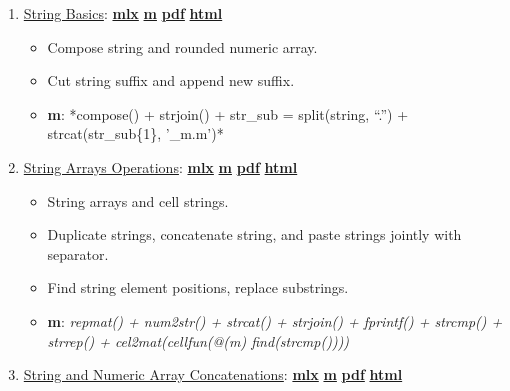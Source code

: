 \documentclass[
]{book}
\providecommand{\tightlist}{%
  \setlength{\itemsep}{0pt}\setlength{\parskip}{0pt}}
\begin{document}
\begin{enumerate}
\def\labelenumi{\arabic{enumi}.}
\tightlist
\item
  \href{https://fanwangecon.github.io/M4Econ/amto/string/htmlpdfm/fs_string.html}{String Basics}: \href{https://github.com/FanWangEcon/M4Econ/blob/master/amto/string/fs_string.mlx}{\textbf{mlx}} \textbar{} \href{https://github.com/FanWangEcon/M4Econ/blob/master/amto/string/htmlpdfm/fs_string.m}{\textbf{m}} \textbar{} \href{https://github.com/FanWangEcon/M4Econ/blob/master/amto/string/htmlpdfm/fs_string.pdf}{\textbf{pdf}} \textbar{} \href{https://fanwangecon.github.io/M4Econ/amto/string/htmlpdfm/fs_string.html}{\textbf{html}}

  \begin{itemize}
  \tightlist
  \item
    Compose string and rounded numeric array.
  \item
    Cut string suffix and append new suffix.
  \item
    \textbf{m}: *compose() + strjoin() + str\_sub = split(string, ``.'') + strcat(str\_sub\{1\}, '\_m.m')*
  \end{itemize}
\item
  \href{https://fanwangecon.github.io/M4Econ/amto/string/htmlpdfm/fs_string_array.html}{String Arrays Operations}: \href{https://github.com/FanWangEcon/M4Econ/blob/master/amto/string/fs_string_array.mlx}{\textbf{mlx}} \textbar{} \href{https://github.com/FanWangEcon/M4Econ/blob/master/amto/string/htmlpdfm/fs_string_array.m}{\textbf{m}} \textbar{} \href{https://github.com/FanWangEcon/M4Econ/blob/master/amto/string/htmlpdfm/fs_string_array.pdf}{\textbf{pdf}} \textbar{} \href{https://fanwangecon.github.io/M4Econ/amto/string/htmlpdfm/fs_string_array.html}{\textbf{html}}

  \begin{itemize}
  \tightlist
  \item
    String arrays and cell strings.
  \item
    Duplicate strings, concatenate string, and paste strings jointly with separator.
  \item
    Find string element positions, replace substrings.
  \item
    \textbf{m}: \emph{repmat() + num2str() + strcat() + strjoin() + fprintf() + strcmp() + strrep() + cel2mat(cellfun(@(m) find(strcmp())))}
  \end{itemize}
\item
  \href{https://fanwangecon.github.io/M4Econ/amto/string/htmlpdfm/fs_string_strcat.html}{String and Numeric Array Concatenations}: \href{https://github.com/FanWangEcon/M4Econ/blob/master/amto/string/fs_string_strcat.mlx}{\textbf{mlx}} \textbar{} \href{https://github.com/FanWangEcon/M4Econ/blob/master/amto/string/htmlpdfm/fs_string_strcat.m}{\textbf{m}} \textbar{} \href{https://github.com/FanWangEcon/M4Econ/blob/master/amto/string/htmlpdfm/fs_string_strcat.pdf}{\textbf{pdf}} \textbar{} \href{https://fanwangecon.github.io/M4Econ/amto/string/htmlpdfm/fs_string_strcat.html}{\textbf{html}}


\end{enumerate}
\end{document}
